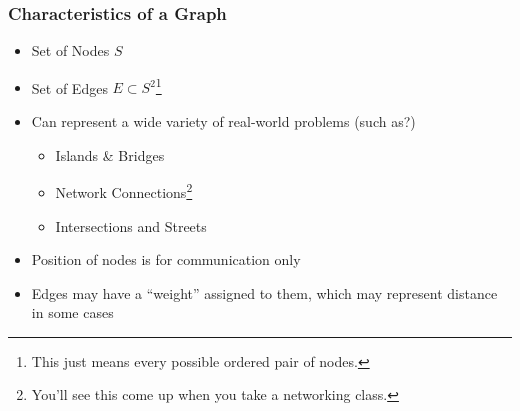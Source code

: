 \documentclass[aspectratio=169]{beamer}
\begin{document}
\begin{frame}
    \frametitle{Characteristics of a Graph}
    \begin{itemize}
        \item Set of Nodes $S$
        \item Set of Edges $E \subset S^{2}$\footnote[frame]{This just means every possible ordered pair of nodes.}
        \pause
        \item Can represent a wide variety of real-world problems (such as?)
        \pause
        \begin{itemize}
            \item Islands \& Bridges
            \item Network Connections\footnote[frame]{You'll see this come up when you take a networking class.}
            \item Intersections and Streets
        \end{itemize}
        \pause
        \item Position of nodes is for communication only
        \item Edges may have a ``weight'' assigned to them, which may represent distance in some cases
    \end{itemize}
\end{frame}
\end{document}
